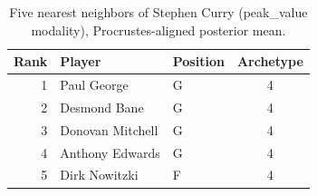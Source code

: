 \begin{table}[htbp]
  \centering\small
  \begin{tabular}{rllc}
    \toprule
    Rank & Player & Position & Archetype \\
    \midrule
    1 & Paul George & G & 4 \\
    2 & Desmond Bane & G & 4 \\
    3 & Donovan Mitchell & G & 4 \\
    4 & Anthony Edwards & G & 4 \\
    5 & Dirk Nowitzki & F & 4 \\
    \bottomrule
  \end{tabular}
  \caption{Five nearest neighbors of Stephen Curry (peak_value modality), Procrustes-aligned posterior mean.}
  \label{tab:Stephen_Curry_neighbors_peak_value}
\end{table}

